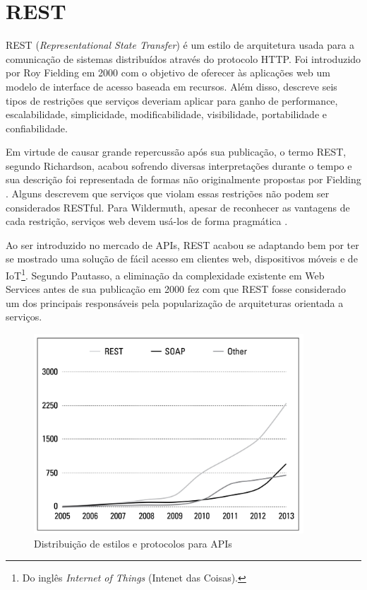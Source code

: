\section{REST}

REST (\textit{Representational State Transfer}) é um estilo de arquitetura usada para a comunicação de sistemas distribuídos através do protocolo HTTP. Foi introduzido por Roy Fielding em 2000 com o objetivo de oferecer às aplicações web um modelo de interface de acesso baseada em recursos. Além disso, descreve seis tipos de restrições que serviços deveriam aplicar para ganho de performance, escalabilidade, simplicidade, modificabilidade, visibilidade, portabilidade e confiabilidade.

Em virtude de causar grande repercussão após sua publicação, o termo REST, segundo Richardson, acabou sofrendo diversas interpretações durante o tempo e sua descrição foi representada de formas não originalmente propostas por Fielding \cite{RichardsonEtAl2013}. Alguns descrevem que serviços que violam essas restrições não podem ser considerados RESTful. Para Wildermuth, apesar de reconhecer as vantagens de cada restrição, serviços web devem usá-los de forma pragmática \cite{Wildermuth2015}.

Ao ser introduzido no mercado de APIs, REST acabou se adaptando bem por ter se mostrado uma solução de fácil acesso em clientes web, dispositivos móveis e de IoT\footnote{
  Do inglês \textit{Internet of Things} (Intenet das Coisas).
}. Segundo Pautasso, a eliminação da complexidade existente em Web Services antes de sua publicação em 2000 fez com que REST fosse considerado um dos principais responsáveis pela popularização de arquiteturas orientada a serviços. \cite{PautassoEtAl2008}

\begin{figure}[H]
  \centering    \includegraphics[width=0.9\textwidth,height=\textheight,keepaspectratio]{figuras/api-styles.jpg}
  \caption{Distribuição de estilos e protocolos para APIs}
\end{figure}

